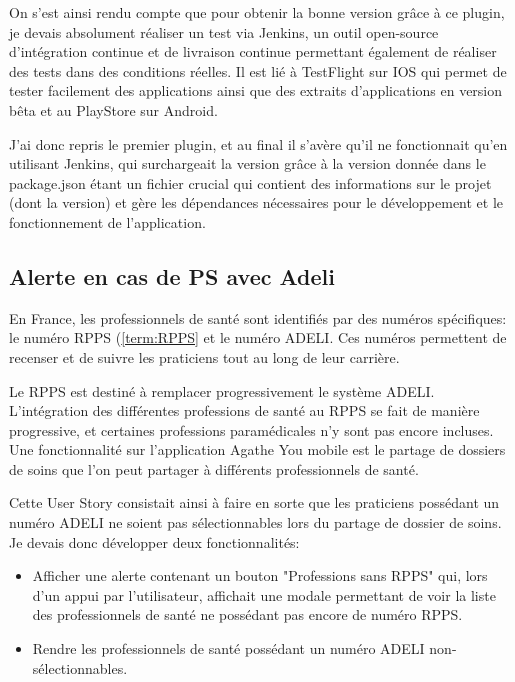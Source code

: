 \documentclass{article}
\begin{document}
On s'est ainsi rendu compte que pour obtenir la bonne version grâce à ce plugin, je devais absolument réaliser un test via Jenkins, un outil open-source d'intégration continue et de livraison continue permettant également de réaliser des tests dans des conditions réelles. Il est lié à TestFlight sur IOS qui permet de tester facilement des applications ainsi que des extraits d'applications en version bêta et au PlayStore sur Android.

J'ai donc repris le premier plugin, et au final il s'avère qu'il ne fonctionnait qu'en utilisant Jenkins, qui surchargeait la version grâce à la version donnée dans le package.json étant un fichier crucial qui contient des informations sur le projet (dont la version) et gère les dépendances nécessaires pour le développement et le fonctionnement de l'application.

\subsection{Alerte en cas de PS avec Adeli}

En France, les professionnels de santé sont identifiés par des numéros spécifiques: le numéro RPPS (\ref{term:RPPS} et le numéro ADELI. Ces numéros permettent de recenser et de suivre les praticiens tout au long de leur carrière.

Le RPPS est destiné à remplacer progressivement le système ADELI. L'intégration des différentes professions de santé au RPPS se fait de manière progressive, et certaines professions paramédicales n'y sont pas encore incluses. \\

Une fonctionnalité sur l'application Agathe You mobile est le partage de dossiers de soins que l'on peut partager à différents professionnels de santé.

Cette User Story consistait ainsi à faire en sorte que les praticiens possédant un numéro ADELI ne soient pas sélectionnables lors du partage de dossier de soins. \\

Je devais donc développer deux fonctionnalités:

\begin{itemize}
    \item Afficher une alerte contenant un bouton "Professions sans RPPS" qui, lors d'un appui par l'utilisateur, affichait une modale permettant de voir la liste des professionnels de santé ne possédant pas encore de numéro RPPS.
    \item Rendre les professionnels de santé possédant un numéro ADELI non-sélectionnables.
\end{itemize}
\end{document}
